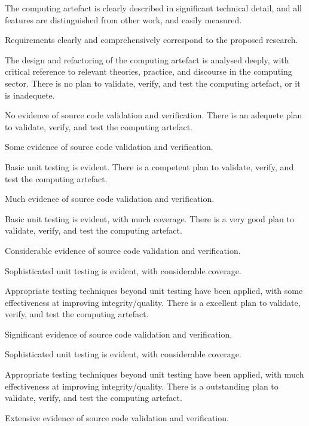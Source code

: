 \begin{markingrubric}
        \grade The computing artefact is clearly described in significant technical detail, and all features are distinguished from other work, and easily measured.
            \par Requirements clearly and comprehensively correspond to the proposed research.
            \par The design and refactoring of the computing artefact is analysed deeply, with critical reference to relevant theories, practice, and discourse in the computing sector.
%
        \grade \fail There is no plan to validate, verify, and test the computing artefact, or it is inadequete.
            \par No evidence of source code validation and verification.
        \grade There is an adequete plan to validate, verify, and test the computing artefact.
            \par Some evidence of source code validation and verification.
            \par Basic unit testing is evident.       
        \grade There is a competent plan to validate, verify, and test the computing artefact.
            \par Much evidence of source code validation and verification.
            \par Basic unit testing is evident, with much coverage.
        \grade There is a very good plan to validate, verify, and test the computing artefact.
            \par Considerable evidence of source code validation and verification.
            \par Sophisticated unit testing is evident, with considerable coverage.
            \par Appropriate testing techniques beyond unit testing have been applied, with some effectiveness at improving integrity/quality.
        \grade There is a excellent plan to validate, verify, and test the computing artefact.
            \par Significant evidence of source code validation and verification.
            \par Sophisticated unit testing is evident, with considerable coverage.
            \par Appropriate testing techniques beyond unit testing have been applied, with much effectiveness at improving integrity/quality.
        \grade There is a outstanding plan to validate, verify, and test the computing artefact. 
            \par Extensive evidence of source code validation and verification.

\end{markingrubric}
